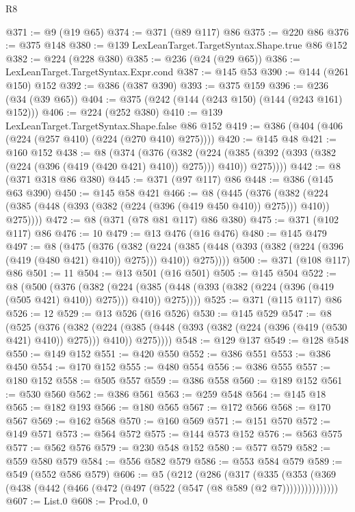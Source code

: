 \begin{lexlean}{R8}
\begin{coremodule}
@371 := @9 (@19 @65)
@374 := @371 (@89 @117) @86
@375 := @220 @86
@376 := @375 @148
@380 := @139 LexLeanTarget.TargetSyntax.Shape.true @86 @152
@382 := @224 (@228 @380)
@385 := @236 (@24 (@29 @65))
@386 := LexLeanTarget.TargetSyntax.Expr.cond
@387 := @145 @53
@390 := @144 (@261 @150) @152
@392 := @386 (@387 @390)
@393 := @375 @159
@396 := @236 (@34 (@39 @65))
@404 := @375 (@242 (@144 (@243 @150) (@144 (@243 @161) @152)))
@406 := @224 (@252 @380)
@410 := @139 LexLeanTarget.TargetSyntax.Shape.false @86 @152
@419 := @386 (@404 (@406 (@224 (@257 @410) (@224 (@270 @410) @275))))
@420 := @145 @48
@421 := @160 @152
@438 := @8
    (@374
      (@376
        (@382
          (@224 (@385 (@392 (@393 (@382 (@224 (@396 (@419 (@420 @421) @410)) @275))) @410)) @275))))
@442 := @8 (@371 @318 @86 @380)
@445 := @371 (@97 @117) @86
@448 := @386 (@145 @63 @390)
@450 := @145 @58 @421
@466 := @8
    (@445
      (@376
        (@382 (@224 (@385 (@448 (@393 (@382 (@224 (@396 (@419 @450 @410)) @275))) @410)) @275))))
@472 := @8 (@371 (@78 @81 @117) @86 @380)
@475 := @371 (@102 @117) @86
@476 := 10
@479 := @13 @476 (@16 @476)
@480 := @145 @479
@497 := @8
    (@475
      (@376
        (@382
          (@224 (@385 (@448 (@393 (@382 (@224 (@396 (@419 (@480 @421) @410)) @275))) @410)) @275))))
@500 := @371 (@108 @117) @86
@501 := 11
@504 := @13 @501 (@16 @501)
@505 := @145 @504
@522 := @8
    (@500
      (@376
        (@382
          (@224 (@385 (@448 (@393 (@382 (@224 (@396 (@419 (@505 @421) @410)) @275))) @410)) @275))))
@525 := @371 (@115 @117) @86
@526 := 12
@529 := @13 @526 (@16 @526)
@530 := @145 @529
@547 := @8
    (@525
      (@376
        (@382
          (@224 (@385 (@448 (@393 (@382 (@224 (@396 (@419 (@530 @421) @410)) @275))) @410)) @275))))
@548 := @129 @137
@549 := @128 @548
@550 := @149 @152
@551 := @420 @550
@552 := @386 @551
@553 := @386 @450
@554 := @170 @152
@555 := @480 @554
@556 := @386 @555
@557 := @180 @152
@558 := @505 @557
@559 := @386 @558
@560 := @189 @152
@561 := @530 @560
@562 := @386 @561
@563 := @259 @548
@564 := @145 @18
@565 := @182 @193
@566 := @180 @565
@567 := @172 @566
@568 := @170 @567
@569 := @162 @568
@570 := @160 @569
@571 := @151 @570
@572 := @149 @571
@573 := @564 @572
@575 := @144 @573 @152
@576 := @563 @575
@577 := @562 @576
@579 := @230 @548 @152
@580 := @577 @579
@582 := @559 @580 @579
@584 := @556 @582 @579
@586 := @553 @584 @579
@589 := @549 (@552 @586 @579)
@606 := @5
    (@212
      (@286
        (@317
          (@335 (@353 (@369 (@438 (@442 (@466 (@472 (@497 (@522 (@547 (@8 @589 (@2 @7)))))))))))))))
@607 := List.{0}
@608 := Prod.{0, 0}

\end{coremodule}
\end{lexlean}

